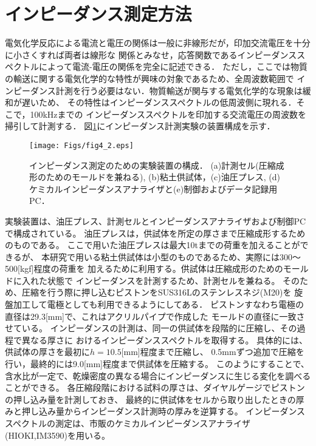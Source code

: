 \section{インピーダンス測定方法}
電気化学反応による電流と電圧の関係は一般に非線形だが，印加交流電圧を十分に小さくすれば両者は線形な
関係とみなせ，応答関数であるインピーダンススペクトルによって電流-電圧の関係を完全に記述できる．
ただし，ここでは物質の輸送に関する電気化学的な特性が興味の対象であるため、全周波数範囲で
インピーダンス計測を行う必要はない．物質輸送が関与する電気化学的な現象は緩和が遅いため、
その特性はインピーダンススペクトルの低周波側に現れる．そこで，100kHzまでの
インピーダンススペクトルを印加する交流電圧の周波数を掃引して計測する．
図\ref{fig:fig4_2}にインピーダンス計測実験の装置構成を示す．
\begin{figure}[h]
	\begin{center}
	\texttt{[image: Figs/fig4\_2.eps]} 
	\end{center}
	\caption{
		インピーダンス測定のための実験装置の構成．
		(a)計測セル(圧縮成形のためのモールドを兼ねる), (b)粘土供試体，(c)油圧プレス, 
		(d)ケミカルインピーダンスアナライザと(e)制御およびデータ記録用PC．
	} 
	\label{fig:fig4_2}
\end{figure}
実験装置は、油圧プレス、計測セルとインピーダンスアナライザおよび制御PCで構成されている。
油圧プレスは，供試体を所定の厚さまで圧縮成形するためのものである。
ここで用いた油圧プレスは最大10tまでの荷重を加えることができるが、
本研究で用いる粘土供試体は小型のものであるため、実際には300〜500[kgf]程度の荷重を
加えるために利用する。供試体は圧縮成形のためのモールドに入れた状態で
インピーダンスを計測するため、計測セルを兼ねる。
そのため、圧縮を行う際に押し込むピストンをSUS316Lのステンレスネジ(M20)を
旋盤加工して電極としても利用できるようにしてある．
ピストンすなわち電極の直径は29.3[mm]で、これはアクリルパイプで作成した
モールドの直径に一致させている。
インピーダンスの計測は、同一の供試体を段階的に圧縮し、その過程で異なる厚さに
おけるインピーダンススペクトルを取得する。
具体的には、供試体の厚さを最初に$h=10.5$[mm]程度まで圧縮し、
0.5mmずつ追加で圧縮を行い，最終的には9.0[mm]程度まで供試体を圧縮する。
このようにすることで、含水比が一定で、乾燥密度の異なる場合にインピーダンスに生じる変化を調べることができる。
各圧縮段階における試料の厚さは、ダイヤルゲージでピストンの押し込み量を計測しておき、
最終的に供試体をセルから取り出したときの厚みと押し込み量からインピーダンス計測時の厚みを逆算する。
インピーダンススペクトルの測定は、市販のケミカルインピーダンスアナライザ(HIOKI,IM3590)を用いる。
